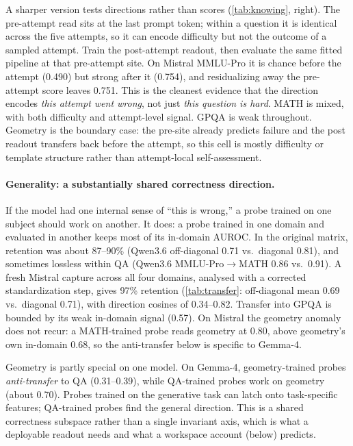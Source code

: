 \documentclass{article}
\begin{document}
A sharper version tests directions rather than scores (\cref{tab:knowing}, right).
The pre-attempt read sits at the last prompt token; within a question it is identical across the five attempts, so it can encode difficulty but not the outcome of a sampled attempt.
Train the post-attempt readout, then evaluate the same fitted pipeline at that pre-attempt site.
On Mistral MMLU-Pro it is chance before the attempt (0.490) but strong after it (0.754), and residualizing away the pre-attempt score leaves 0.751.
This is the cleanest evidence that the direction encodes \emph{this attempt went wrong}, not just \emph{this question is hard}.
MATH is mixed, with both difficulty and attempt-level signal.
GPQA is weak throughout.
Geometry is the boundary case: the pre-site already predicts failure and the post readout transfers back before the attempt, so this cell is mostly difficulty or template structure rather than attempt-local self-assessment.

\paragraph{Generality: a substantially shared correctness direction.}
If the model had one internal sense of ``this is wrong,'' a probe trained on one subject should work on another.
It does: a probe trained in one domain and evaluated in another keeps most of its in-domain AUROC.
In the original matrix, retention was about 87--90\% (Qwen3.6 off-diagonal 0.71 vs.\ diagonal 0.81), and sometimes lossless within QA (Qwen3.6 MMLU-Pro$\to$MATH 0.86 vs.\ 0.91).
A fresh Mistral capture across all four domains, analysed with a corrected standardization step, gives 97\% retention (\cref{tab:transfer}: off-diagonal mean 0.69 vs.\ diagonal 0.71), with direction cosines of 0.34--0.82.
Transfer into GPQA is bounded by its weak in-domain signal (0.57).
On Mistral the geometry anomaly does not recur: a MATH-trained probe reads geometry at 0.80, above geometry's own in-domain 0.68, so the anti-transfer below is specific to Gemma-4.

Geometry is partly special on one model.
On Gemma-4, geometry-trained probes \emph{anti-transfer} to QA (0.31--0.39), while QA-trained probes work on geometry (about 0.70).
Probes trained on the generative task can latch onto task-specific features; QA-trained probes find the general direction.
This is a shared correctness subspace rather than a single invariant axis, which is what a deployable readout needs and what a workspace account (below) predicts.
\end{document}
